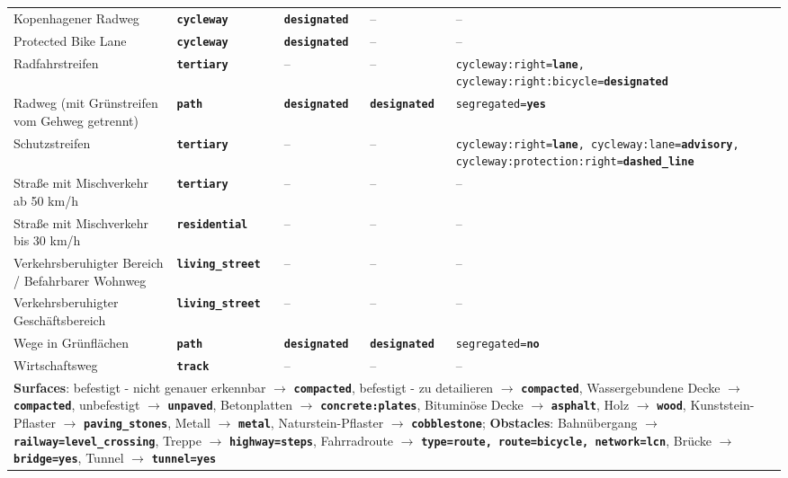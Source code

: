 \begin{table}[!t]
{\begin{tabular}{@{}p{5cm}p{3cm}p{3cm}p{3cm}p{5cm}@{}}
    Kopenhagener Radweg & \texttt{\textbf{cycleway}} & \texttt{\textbf{designated}} & -- & -- \\
    Protected Bike Lane & \texttt{\textbf{cycleway}} & \texttt{\textbf{designated}} & -- & -- \\
    Radfahrstreifen & \texttt{\textbf{tertiary}} & -- & -- & \texttt{cycleway:right=\textbf{lane}, cycleway:right:bicycle=\textbf{\allowbreak designated}} \\
    Radweg (mit Grünstreifen vom Gehweg getrennt) & \texttt{\textbf{path}} & \texttt{\textbf{designated}} & \texttt{\textbf{designated}} & \texttt{segregated=\textbf{yes}} \\
    Schutzstreifen & \texttt{\textbf{tertiary}} & -- & -- & \texttt{cycleway:right=\textbf{lane}, cycleway:lane=\textbf{advisory}, cycleway:protection:\allowbreak right=\textbf{dashed\_line}} \\
    Straße mit Mischverkehr ab 50 km/h & \texttt{\textbf{tertiary}} & -- & -- & -- \\
    Straße mit Mischverkehr bis 30 km/h & \texttt{\textbf{residential}} & -- & -- & -- \\
    Verkehrsberuhigter Bereich / Befahrbarer Wohnweg & \texttt{\textbf{living\_street}} & -- & -- & -- \\
    Verkehrsberuhigter Geschäftsbereich & \texttt{\textbf{living\_street}} & -- & -- & -- \\
    Wege in Grünflächen & \texttt{\textbf{path}} & \texttt{\textbf{designated}} & \texttt{\textbf{designated}} & \texttt{segregated=\textbf{no}} \\
    Wirtschaftsweg & \texttt{\textbf{track}} & -- & -- & -- \\
    \hline
    \multicolumn{5}{p{20cm}}{\textbf{Surfaces}: befestigt - nicht genauer erkennbar $\rightarrow$ \texttt{\textbf{compacted}}, befestigt - zu detailieren $\rightarrow$ \texttt{\textbf{compacted}}, Wassergebundene Decke $\rightarrow$ \texttt{\textbf{compacted}}, unbefestigt $\rightarrow$ \texttt{\textbf{unpaved}}, Betonplatten $\rightarrow$ \texttt{\textbf{concrete:plates}}, Bituminöse Decke $\rightarrow$ \texttt{\textbf{asphalt}}, Holz $\rightarrow$ \texttt{\textbf{wood}}, Kunststein-Pflaster $\rightarrow$ \texttt{\textbf{paving\_stones}}, Metall $\rightarrow$ \texttt{\textbf{metal}}, Naturstein-Pflaster $\rightarrow$ \texttt{\textbf{cobblestone}}; \textbf{Obstacles}: Bahnübergang $\rightarrow$ \texttt{\textbf{railway=level\_crossing}}, Treppe $\rightarrow$ \texttt{\textbf{highway=steps}}, Fahrradroute $\rightarrow$ \texttt{\textbf{type=route, route=bicycle, network=lcn}}, Brücke $\rightarrow$ \texttt{\textbf{bridge=yes}}, Tunnel $\rightarrow$ \texttt{\textbf{tunnel=yes}}}. \\
\end{tabular}
}
\end{table}

